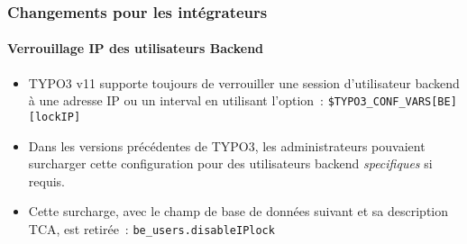 %

\begin{frame}[fragile]
	\frametitle{Changements pour les intégrateurs}
	\framesubtitle{Verrouillage IP des utilisateurs Backend}


	\begin{itemize}
		\item TYPO3 v11 supporte toujours de verrouiller une session d'utilisateur
			backend à une adresse IP ou un interval en utilisant l'option~:\newline
			\smaller\texttt{\$TYPO3\_CONF\_VARS[BE][lockIP]}\normalsize
		\item Dans les versions précédentes de TYPO3, les administrateurs pouvaient
			surcharger cette configuration pour des utilisateurs backend \textit{specifiques}
			si requis.
		\item Cette surcharge, avec le champ de base de données suivant et sa description TCA,
			est retirée~:\newline
			\smaller\texttt{be\_users.disableIPlock}\normalsize
	\end{itemize}
\end{frame}

